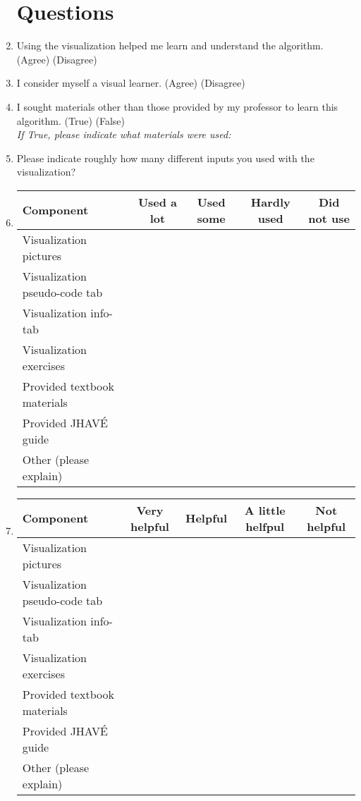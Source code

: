 \documentclass[letter]{article}
\begin{document}
\begin{enumerate}

\section*{Questions}

\item Using the visualization helped me learn and understand the algorithm.
(Agree) (Disagree)

\item I consider myself a visual learner.
(Agree) (Disagree)

\item I sought materials other than those provided by my professor to learn this algorithm.
(True) (False) \\ \textsl{If True, please indicate what materials were used:}

\item Please indicate roughly how many different inputs you used with the visualization? \underline{\hspace{1cm}}

\item
\begin{tabular}{| l | c | c | c | c |}
\hline
\textbf{Component} & \textbf{Used a lot} & \textbf{Used some} & \textbf{Hardly used} & \textbf{Did not use} \\
\hline
Visualization pictures &&&& \\
\hline
Visualization pseudo-code tab &&&& \\
\hline
Visualization info-tab &&&& \\
\hline
Visualization exercises &&&& \\
\hline
Provided textbook materials &&&& \\
\hline
Provided JHAVÉ guide &&&& \\
\hline
Other (please explain) &&&& \\
\hline
\end{tabular}

\item
\begin{tabular}{| l | c | c | c | c |}
\hline
\textbf{Component} & \textbf{Very helpful} & \textbf{Helpful} & \textbf{A little helfpul} & \textbf{Not helpful} \\
\hline
Visualization pictures &&&& \\
\hline
Visualization pseudo-code tab &&&& \\
\hline
Visualization info-tab &&&& \\
\hline
Visualization exercises &&&& \\
\hline
Provided textbook materials &&&& \\
\hline
Provided JHAVÉ guide &&&& \\
\hline
Other (please explain) &&&& \\
\hline
\end{tabular}


\end{enumerate}
\end{document}
